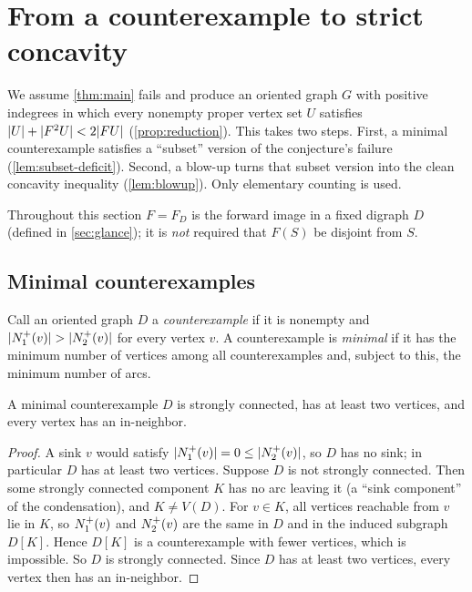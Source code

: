\section{From a counterexample to strict concavity}\label{sec:reduction}

\begin{idea}
We assume \cref{thm:main} fails and produce an oriented graph $G$ with
positive indegrees in which every nonempty proper vertex set $U$ satisfies
$\lvert U\rvert+\lvert F^2U\rvert<2\lvert FU\rvert$ (\cref{prop:reduction}). This takes two steps.
First, a minimal counterexample satisfies a ``subset'' version of the
conjecture's failure (\cref{lem:subset-deficit}). Second, a blow-up turns
that subset version into the clean concavity inequality
(\cref{lem:blowup}). Only elementary counting is used.
\end{idea}

Throughout this section $F=F_D$ is the forward image in a fixed digraph $D$
(defined in \cref{sec:glance}); it is \emph{not} required that $F(S)$ be
disjoint from $S$.

\subsection{Minimal counterexamples}

Call an oriented graph $D$ a \emph{counterexample} if it is nonempty and
$\lvert N^+_1(v)\rvert>\lvert N^+_2(v)\rvert$ for every vertex $v$. A counterexample is
\emph{minimal} if it has the minimum number of vertices among all
counterexamples and, subject to this, the minimum number of arcs.

\begin{lemma}\label{lem:strong}
A minimal counterexample $D$ is strongly connected, has at least two
vertices, and every vertex has an in-neighbor.
\end{lemma}

\begin{proof}
A sink $v$ would satisfy $\lvert N^+_1(v)\rvert=0\le\lvert N^+_2(v)\rvert$, so $D$ has no
sink; in particular $D$ has at least two vertices. Suppose $D$ is not
strongly connected. Then some strongly connected component $K$ has no arc
leaving it (a ``sink component'' of the condensation), and $K\ne V(D)$.
For $v\in K$, all vertices reachable from $v$ lie in $K$, so $N^+_1(v)$ and
$N^+_2(v)$ are the same in $D$ and in the induced subgraph $D[K]$. Hence $D[K]$
is a counterexample with fewer vertices, which is impossible. So $D$ is
strongly connected. Since $D$ has at least two vertices, every vertex then
has an in-neighbor.
\end{proof}

